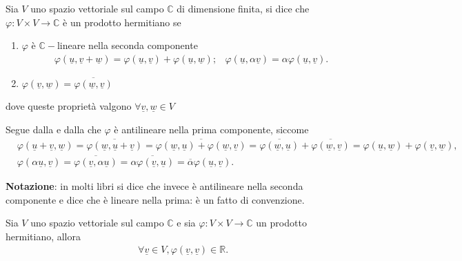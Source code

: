 \begin{definition}
    Sia $V$ uno spazio vettoriale sul campo $\mathbb{C}$ di dimensione finita, si dice che $\varphi: V \times V \to \mathbb{C}$ è un prodotto hermitiano se
    \begin{enumerate}[label=\protect\circled{\arabic*}]
        \item $\varphi$ è $\mathbb{C}-$lineare nella seconda componente
        \begin{align}
            &\varphi(\underline{u}, \underline{v} + \underline{w}) = \varphi(\underline{u}, \underline{v}) + \varphi(\underline{u}, \underline{w});
            &\varphi(\underline{u}, \alpha \underline{v}) = \alpha \varphi(\underline{u}, \underline{v}).
        \end{align}
        \item $\varphi(\underline{v}, \underline{w}) = \overline{\varphi(\underline{w}, \underline{v})}$
    \end{enumerate} 
    dove queste proprietà valgono $\forall \underline{v}, \underline{w} \in V$
\end{definition}
\begin{remark}
    Segue dalla  e dalla  che $\varphi$ è antilineare nella prima componente, siccome
    \begin{align}
        &\varphi(\underline{u} + \underline{v}, \underline{w}) = \overline{\varphi(\underline{w}, \underline{u} + \underline{v})} = \overline{\varphi(\underline{w}, \underline{u}) + \varphi(\underline{w}, \underline{v})} = \overline{\varphi(\underline{w}, \underline{u})} + \overline{\varphi(\underline{w}, \underline{v})} = \varphi(\underline{u}, \underline{w}) + \varphi(\underline{v}, \underline{w}), \\
        &\varphi(\alpha \underline{u}, \underline{v}) = \overline{\varphi(\underline{v}, \alpha \underline{u})} = \overline{\alpha \varphi(\underline{v}, \underline{u})} = \overline{\alpha} \varphi(\underline{u}, \underline{v}).
    \end{align}
\end{remark}
\textbf{Notazione}: in molti libri si dice che invece è antilineare nella seconda componente e dice che è lineare nella prima: è un fatto di convenzione.
\begin{prop}
    Sia $V$ uno spazio vettoriale sul campo $\mathbb{C}$ e sia $\varphi: V \times V \to \mathbb{C}$ un prodotto hermitiano, allora
    \begin{align}
        &\forall \underline{v} \in V, \varphi(\underline{v}, \underline{v}) \in \mathbb{R}.
    \end{align}
\end{prop}
